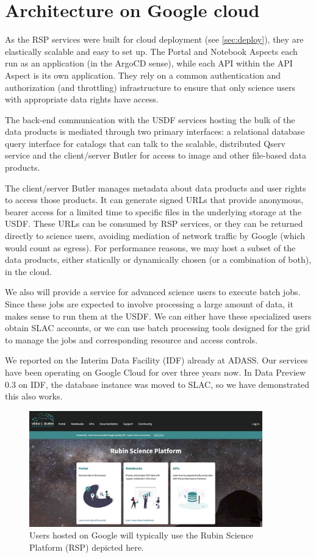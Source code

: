 \section{Architecture on Google cloud} \label{sec:google}

As the RSP services were built for cloud deployment (see \autoref{sec:deploy}), they are elastically scalable and easy to set up.
The Portal and Notebook Aspects each run as an application (in the ArgoCD sense), while each API within the API Aspect is its own application.
They rely on a common authentication and authorization (and throttling) infrastructure to ensure that only science users with appropriate data rights have access.

The back-end communication with the USDF services hosting the bulk of the data products is mediated through two primary interfaces: a relational database query interface for catalogs that can talk to the scalable, distributed Qserv service\cite{2011Wang:2011:QDS:2063348.2063364, DMTN-243} and the client/server Butler\cite{2024SPIE13101.129Jtmp,2022SPIE12189E..11J} for access to image and other file-based data products.

The client/server Butler manages metadata about data products and user rights to access those products.
It can generate signed URLs that provide anonymous, bearer access for a limited time to specific files in the underlying storage at the USDF.
These URLs can be consumed by RSP services, or they can be returned directly to science users, avoiding mediation of network traffic by Google (which would count as egress).
For performance reasons, we may host a subset of the data products, either statically or dynamically chosen (or a combination of both), in the cloud.

We also will provide a service for advanced science users to execute batch jobs.
Since these jobs are expected to involve processing a large amount of data, it makes sense to run them at the USDF.
We can either have these specialized users obtain SLAC accounts, or we can use batch processing tools designed for the grid to manage the jobs and corresponding resource and access controls.

We reported on the Interim Data Facility (IDF) already at ADASS\cite{2021arXiv211115030O}.
Our services have been operating on Google Cloud for over three years now.
In Data Preview 0.3 on IDF,\cite{RTN-050} the database instance was moved to SLAC, so we have demonstrated this also works.


\begin{figure}
\begin{centering}
\includegraphics[width=0.9\textwidth]{RSP.png}
	\caption{ Users hosted on Google will typically use the Rubin Science Platform (RSP) depicted here.  \label{fig:rsp}}
\end{centering}
\end{figure}
